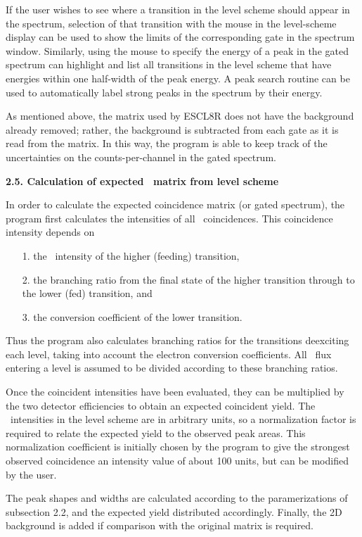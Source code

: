 If the user wishes to see where a transition in the level scheme should appear
in the spectrum, selection of that transition with the mouse in the
level-scheme display can be used to show the limits of the corresponding gate
in the spectrum window. Similarly, using the mouse to specify the energy of a
peak in the gated spectrum can highlight and list all transitions in the level
scheme that have energies within one half-width of the peak energy. A peak
search routine can be used to automatically label strong peaks in the spectrum
by their energy. 

As mentioned above, the matrix used by ESCL8R does not have the background
already removed; rather, the background is subtracted from each gate as it is
read from the matrix. In this way, the program is able to keep track of the
uncertainties on the counts-per-channel in the gated spectrum.

\noindent
{\bf 2.5. Calculation of expected \ghg\ matrix from level scheme}

In order to calculate the expected coincidence matrix (or gated spectrum), the
program first calculates the intensities of all \ghg\ coincidences. This
coincidence intensity depends on
\begin{itemize}
\item[1.] the \ghray\ intensity of the higher (feeding) transition,
\item[2.] the branching ratio from the final state of the higher transition
             through to the lower (fed) transition, and
\item[3.] the conversion coefficient of the lower transition.
\end{itemize}
Thus the program also calculates branching ratios for the transitions
deexciting each level, taking into account the electron conversion
coefficients. All \ghray\ flux entering a level is assumed to be divided
according to these branching ratios.

Once the coincident intensities have been evaluated, they can be multiplied by
the two detector efficiencies to obtain an expected coincident yield. The
\ghray\ intensities in the level scheme are in arbitrary units, so a
normalization factor is required to relate the expected yield to the observed
peak areas. This normalization coefficient is initially chosen by the program
to give the strongest observed coincidence an intensity value of about 100
units, but can be modified by the user.

The peak shapes and widths are calculated according to the paramerizations of
subsection 2.2, and the expected yield distributed accordingly. Finally, the 2D
background is added if comparison with the original matrix is required.

